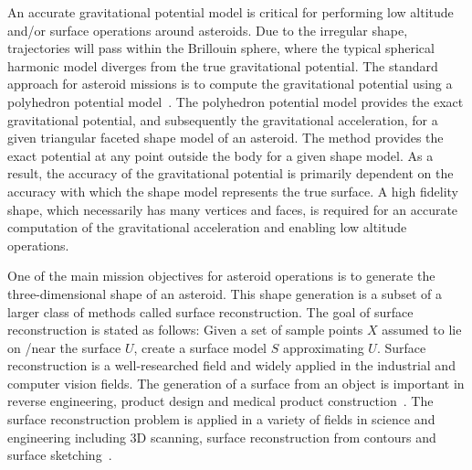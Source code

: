 An accurate gravitational potential model is critical for performing low altitude and/or surface operations around asteroids.
Due to the irregular shape, trajectories will pass within the Brillouin sphere, where the typical spherical harmonic model diverges from the true gravitational potential.
The standard approach for asteroid missions is to compute the gravitational potential using a polyhedron potential model~\cite{werner1996}.
The polyhedron potential model provides the exact gravitational potential, and subsequently the gravitational acceleration, for a given triangular faceted shape model of an asteroid.
The method provides the exact potential at any point outside the body for a given shape model.
As a result, the accuracy of the gravitational potential is primarily dependent on the accuracy with which the shape model represents the true surface.
A high fidelity shape, which necessarily has many vertices and faces, is required for an accurate computation of the gravitational acceleration and enabling low altitude operations.

One of the main mission objectives for asteroid operations is to generate the three-dimensional shape of an asteroid.
This shape generation is a subset of a larger class of methods called surface reconstruction.
The goal of surface reconstruction is stated as follows: Given a set of sample points \( X\) assumed to lie on /near the surface \( U \), create a surface model \( S \) approximating \( U \).
Surface reconstruction is a well-researched field and widely applied in the industrial and computer vision fields.
The generation of a surface from an object is important in reverse engineering, product design and medical product construction~\cite{amenta2001}.
The surface reconstruction problem is applied in a variety of fields in science and engineering including 3D scanning, surface reconstruction from contours and surface sketching~\cite{hoppe1992}.

